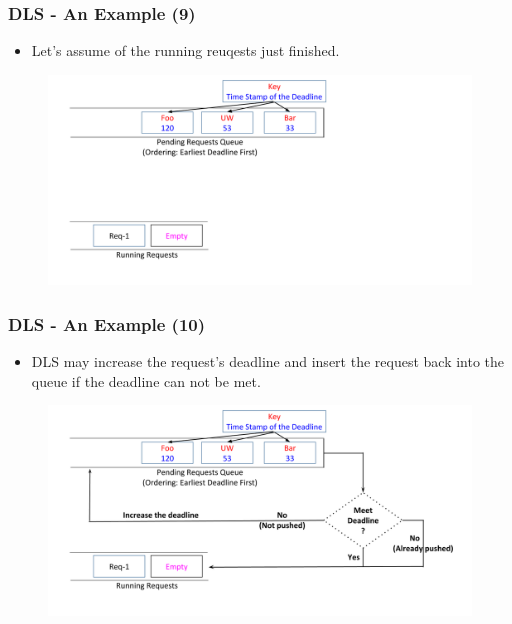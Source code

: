 \documentclass{beamer}
\begin{document}
\begin{frame}
  \frametitle{DLS - An Example (9)}
  \begin{itemize}
  \item Let's assume of the running reuqests just finished.
    \newline
    \newline
  \end{itemize}
  \begin{figure}
    \begin{center}
      \centerline{\includegraphics[scale=0.33]{img/DLS_Example8_3.png}}
    \end{center}
  \end{figure}
\end{frame}

\begin{frame}
  \frametitle{DLS - An Example (10)}
  \begin{itemize}
  \item DLS may increase the request's deadline and insert the request back
    into the queue if the deadline can not be met.
    \newline
  \end{itemize}
  \begin{figure}
    \begin{center}
      \centerline{\includegraphics[scale=0.33]{img/DLS_Example8_4.png}}
    \end{center}
  \end{figure}
\end{frame}
\end{document}
